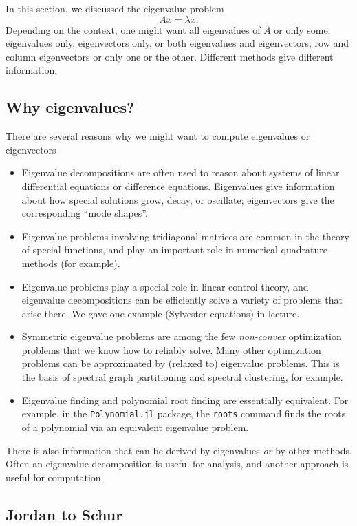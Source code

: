 \documentclass[12pt, leqno]{article}
\begin{document}
In this section, we discussed the eigenvalue problem
\[
  A x = \lambda x.
\]
Depending on the context, one might want all eigenvalues of $A$ or
only some; eigenvalues only, eigenvectors only, or both eigenvalues
and eigenvectors; row and column eigenvectors or only one or the
other.  Different methods give different information.

\subsection{Why eigenvalues?}

There are several reasons why we might want to compute
eigenvalues or eigenvectors
\begin{itemize}
\item
  Eigenvalue decompositions are often used to reason about systems of
  linear differential equations or difference equations.  Eigenvalues
  give information about how special solutions grow, decay, or
  oscillate; eigenvectors give the corresponding ``mode shapes''.
\item
  Eigenvalue problems involving tridiagonal matrices are common in
  the theory of special functions, and play an important role in
  numerical quadrature methods (for example).
\item
  Eigenvalue problems play a special role in linear control theory,
  and eigenvalue decompositions can be efficiently solve a variety of
  problems that arise there.  We gave one example (Sylvester
  equations) in lecture.
\item
  Symmetric eigenvalue problems are among the few {\em non-convex}
  optimization problems that we know how to reliably solve.  Many
  other optimization problems can be approximated by (relaxed to)
  eigenvalue problems.  This is the basis of spectral graph
  partitioning and spectral clustering, for example.
\item
  Eigenvalue finding and polynomial root finding are essentially
  equivalent.  For example, in the {\tt Polynomial.jl} package,
  the {\tt roots} command finds
  the roots of a polynomial via an equivalent eigenvalue problem.
\end{itemize}
There is also information that can be derived by eigenvalues {\em or}
by other methods.  Often an eigenvalue decomposition is useful for
analysis, and another approach is useful for computation.

\subsection{Jordan to Schur}
\end{document}
